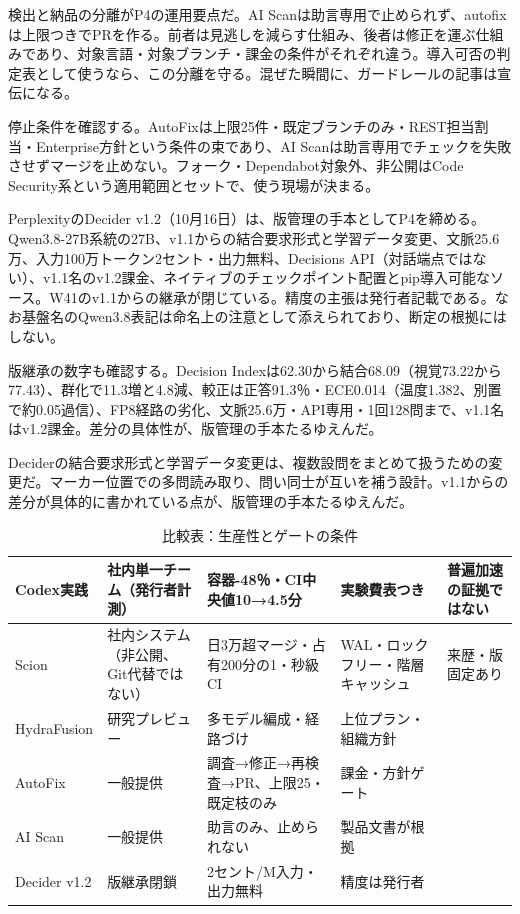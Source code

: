 \documentclass[lualatex,a4paper,10pt]{jlreq}
\begin{document}
検出と納品の分離がP4の運用要点だ。AI Scanは助言専用で止められず、autofixは上限つきでPRを作る。前者は見逃しを減らす仕組み、後者は修正を運ぶ仕組みであり、対象言語・対象ブランチ・課金の条件がそれぞれ違う。導入可否の判定表として使うなら、この分離を守る。混ぜた瞬間に、ガードレールの記事は宣伝になる。
\cite{B34,B77,B35,B78}


停止条件を確認する。AutoFixは上限25件・既定ブランチのみ・REST担当割当・Enterprise方針という条件の束であり、AI Scanは助言専用でチェックを失敗させずマージを止めない。フォーク・Dependabot対象外、非公開はCode Security系という適用範囲とセットで、使う現場が決まる。
\cite{B34,B77,B35,B78}


PerplexityのDecider v1.2（10月16日）は、版管理の手本としてP4を締める。Qwen3.8-27B系統の27B、v1.1からの結合要求形式と学習データ変更、文脈25.6万、入力100万トークン2セント・出力無料、Decisions API（対話端点ではない）、v1.1名のv1.2課金、ネイティブのチェックポイント配置とpip導入可能なソース。W41のv1.1からの継承が閉じている。精度の主張は発行者記載である。なお基盤名のQwen3.8表記は命名上の注意として添えられており、断定の根拠にはしない。
\cite{B37,B36,B38}


版継承の数字も確認する。Decision Indexは62.30から結合68.09（視覚73.22から77.43）、群化で11.3増と4.8減、較正は正答91.3％・ECE0.014（温度1.382、別置で約0.05過信）、FP8経路の劣化、文脈25.6万・API専用・1回128問まで、v1.1名はv1.2課金。差分の具体性が、版管理の手本たるゆえんだ。
\cite{B37,B36,B38}


Deciderの結合要求形式と学習データ変更は、複数設問をまとめて扱うための変更だ。マーカー位置での多問読み取り、問い同士が互いを補う設計。v1.1からの差分が具体的に書かれている点が、版管理の手本たるゆえんだ。
\cite{B37,B36,B38}


\begin{table}[htbp]\centering\footnotesize
\caption{比較表：生産性とゲートの条件}
\begin{tabularx}{0.96\linewidth}{@{}lXXXX@{}}
\toprule
Codex実践 & 社内単一チーム（発行者計測） & 容器-48％・CI中央値10→4.5分 & 実験費表つき & 普遍加速の証拠ではない \cite{B31} \\
\midrule
Scion & 社内システム（非公開、Git代替ではない） & 日3万超マージ・占有200分の1・秒級CI & WAL・ロックフリー・階層キャッシュ & 来歴・版固定あり \cite{B32,B75} \\
\midrule
HydraFusion & 研究プレビュー & 多モデル編成・経路づけ & 上位プラン・組織方針 \cite{B33,B76} \\
\midrule
AutoFix & 一般提供 & 調査→修正→再検査→PR、上限25・既定枝のみ & 課金・方針ゲート \cite{B34,B77} \\
\midrule
AI Scan & 一般提供 & 助言のみ、止められない & 製品文書が根拠 \cite{B35,B78} \\
\midrule
Decider v1.2 & 版継承閉鎖 & 2セント/M入力・出力無料 & 精度は発行者 \cite{B37,B36,B38} \\
\bottomrule
\end{tabularx}
\end{table}
\end{document}
